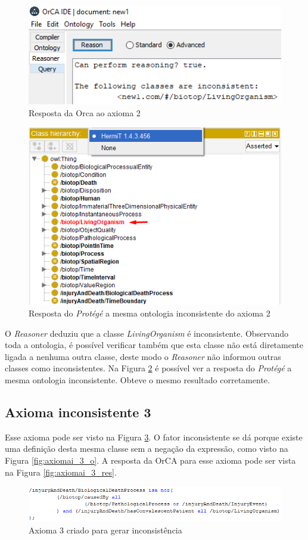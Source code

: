 \documentclass{bcc}
\begin{document}
\begin{figure}[H]
\centering
\includegraphics[width=.6\textwidth]{Figuras/axiomai_2_res.png}
\caption{Resposta da Orca ao axioma 2} 
\label{fig:axiomai_2_res}
\end{figure}

\begin{figure}[H]
\centering
\includegraphics[width=.6\textwidth]{Figuras/axiomai_2_protege.png}
\caption{Resposta do \textit{Protégé} a mesma ontologia inconsistente do axioma 2} 
\label{fig:axiomai_2_protege}
\end{figure}

O \textit{Reasoner} deduziu que a classe \textit{LivingOrganism} é inconsistente. Observando toda a ontologia, é possível verificar também que esta classe não está diretamente ligada a nenhuma outra classe, deste modo o \textit{Reasoner} não informou outras classes como inconsistentes. Na Figura \ref{fig:axiomai_2_protege} é possível ver a resposta do \textit{Protégé} a mesma ontologia inconsistente. Obteve o mesmo resultado corretamente.

\subsection{Axioma inconsistente 3}
Esse axioma pode ser visto na Figura \ref{fig:axiomai_3}. O fator inconsistente se dá porque existe uma definição desta mesma classe sem a negação da expressão, como visto na Figura \ref{fig:axiomai_3_o}. A resposta da OrCA para esse axioma pode ser vista na Figura \ref{fig:axiomai_3_res}.

\begin{figure}[H]
\centering
\includegraphics[width=.8\textwidth]{Figuras/axiomai_3.png}
\caption{Axioma 3 criado para gerar inconsistência} 
\label{fig:axiomai_3}
\end{figure}
\end{document}
